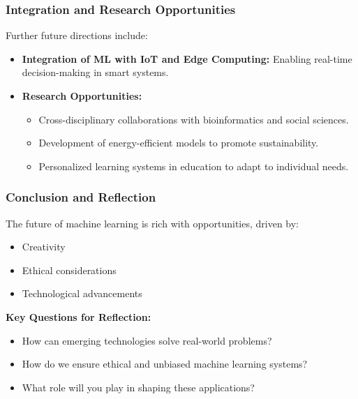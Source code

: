 \documentclass[aspectratio=169]{beamer}
\begin{document}
\begin{frame}[fragile]
    \frametitle{Integration and Research Opportunities}
    Further future directions include:
    \begin{itemize}
        \item \textbf{Integration of ML with IoT and Edge Computing:} Enabling real-time decision-making in smart systems.
        \item \textbf{Research Opportunities:}
        \begin{itemize}
            \item Cross-disciplinary collaborations with bioinformatics and social sciences.
            \item Development of energy-efficient models to promote sustainability.
            \item Personalized learning systems in education to adapt to individual needs.
        \end{itemize}
    \end{itemize}
\end{frame}

\begin{frame}[fragile]
    \frametitle{Conclusion and Reflection}
    The future of machine learning is rich with opportunities, driven by:
    \begin{itemize}
        \item Creativity
        \item Ethical considerations
        \item Technological advancements
    \end{itemize}
    \textbf{Key Questions for Reflection:}
    \begin{itemize}
        \item How can emerging technologies solve real-world problems?
        \item How do we ensure ethical and unbiased machine learning systems?
        \item What role will you play in shaping these applications?
    \end{itemize}
\end{frame}
\end{document}
